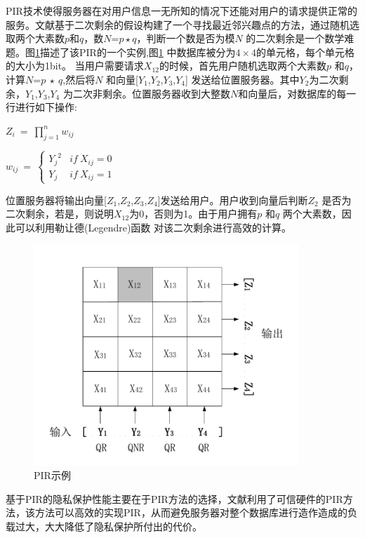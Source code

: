 PIR技术使得服务器在对用户信息一无所知的情况下还能对用户的请求提供正常的服务。文献\cite{ghinita2008private}基于二次剩余的假设\cite{kushilevitz1997replication}构建了一个寻找最近邻兴趣点的方法，通过随机选取两个大素数$p$和$q$，数$N$=$p\star q$，判断一个数是否为模$N$ 的二次剩余是一个数学难题。图\ref{fig:PIR_pdf}描述了该PIR的一个实例,图\ref{fig:PIR_pdf} 中数据库被分为$4\times 4$的单元格，每个单元格的大小为1bit。 当用户需要请求$X_{12}$的时候，首先用户随机选取两个大素数$p$ 和$q$，计算$N$=$p ~\star ~q$,然后将$N$ 和向量[$Y_1$,$Y_2$,$Y_3$,$Y_4$] 发送给位置服务器。其中$Y_2$为二次剩余，$Y_1$,$Y_3$,$Y_4$ 为二次非剩余。位置服务器收到大整数$N$和向量后，对数据库的每一行进行如下操作:
\begin{center}
$Z_i~=~ \prod_{j=1}^{n} w_{ij}$


$w_{ij}~=~
\left\{\begin{matrix}
 {Y_j}^2& if~X_{ij}=0\\
 {Y_j}& if~X_{ij}=1
\end{matrix}\right.
$
\end{center}
位置服务器将输出向量[$Z_1$,$Z_2$,$Z_3$,$Z_4$]发送给用户。用户收到向量后判断$Z_2$ 是否为二次剩余，若是，则说明$X_{12}$为0，否则为1。由于用户拥有$p$ 和$q$ 两个大素数，因此可以利用勒让德(Legendre)函数\cite{flath1989introduction} 对该二次剩余进行高效的计算。
\begin{figure}[H]
\centering
\includegraphics[width=10cm]{fig/PIR.pdf}
\caption{PIR示例} %
\label{fig:PIR_pdf}
\end{figure}

基于PIR的隐私保护性能主要在于PIR方法的选择，文献\cite{khoshgozaran2011location}利用了可信硬件的PIR方法，该方法可以高效的实现PIR，从而避免服务器对整个数据库进行造作造成的负载过大，大大降低了隐私保护所付出的代价。
